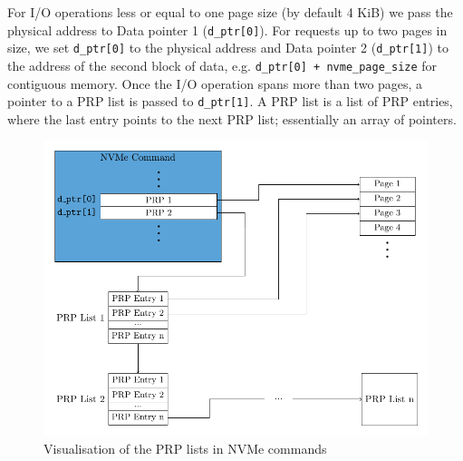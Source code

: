 For I/O operations less or equal to one page size (by default 4 KiB) we pass the physical address to Data pointer 1 (\texttt{d\_ptr[0]}). For requests up to two pages in size, we set \texttt{d\_ptr[0]} to the physical address and Data pointer 2 (\texttt{d\_ptr[1]}) to the address of the second block of data, e.g. \texttt{d\_ptr[0] + nvme\_page\_size} for contiguous memory. Once the I/O operation spans more than two pages, a pointer to a PRP list is passed to \texttt{d\_ptr[1]}. A PRP list is a list of PRP entries, where the last entry points to the next PRP list; essentially an array of pointers.

\begin{figure}
  \centering
    \includegraphics[width=\textwidth]{figures/prp-list}
    \caption{Visualisation of the PRP lists in NVMe commands}
    \label{fig:prp-list}
\end{figure}


